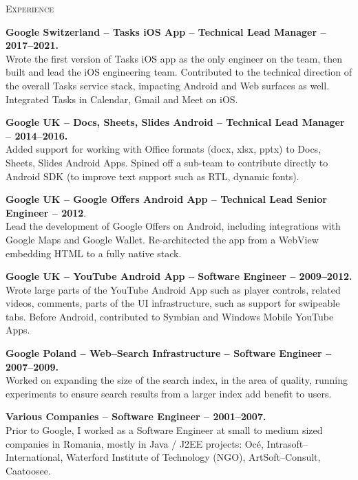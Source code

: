 \documentclass[10pt]{article}
\begin{document}
\vspace{0.16in}
\noindent
\textcolor{Primary}{{\large \textsc{Experience}}}
\begin{list}{}{\leftmargin=0em}

\item
{\bf Google Switzerland -- Tasks iOS App -- Technical Lead Manager -- 2017--2021.}\\
Wrote the first version of Tasks iOS app as the only engineer on the team, then built and lead the iOS engineering team.
Contributed to the technical direction of the overall Tasks service stack, impacting Android and Web surfaces
as well. Integrated Tasks in Calendar, Gmail and Meet on iOS.
  
\item
{\bf Google UK -- Docs, Sheets, Slides Android -- Technical Lead Manager -- 2014--2016.}\\
Added support for working with Office formats (docx, xlsx, pptx) to Docs, Sheets, Slides Android Apps. Spined off a
sub-team to contribute directly to Android SDK (to improve text support such as RTL, dynamic fonts). 

\item
{\bf Google UK -- Google Offers Android App -- Technical Lead Senior Engineer -- 2012}.\\
Lead the development of Google Offers on Android, including integrations with Google Maps and Google Wallet.
Re-architected the app from a WebView embedding HTML to a fully native stack.

\item
{\bf Google UK -- YouTube Android App -- Software Engineer -- 2009--2012.}\\
Wrote large parts of the YouTube Android App such as player controls, related videos, comments, parts of the UI 
infrastructure, such as support for swipeable tabs.
Before Android, contributed to Symbian and Windows Mobile YouTube Apps.

\item
{\bf Google Poland -- Web--Search Infrastructure -- Software Engineer -- 2007--2009.}\\
Worked on expanding the size of the search index, in the area of quality, running experiments to ensure
search results from a larger index add benefit to users.

\item
{\bf Various Companies -- Software Engineer -- 2001--2007.}\\
Prior to Google, I worked as a Software Engineer at small to medium sized companies in Romania, mostly in Java / J2EE projects:
Oc\'e, Intrasoft--International, Waterford Institute of Technology (NGO), ArtSoft--Consult, Caatoosee.

\end{list}
\end{document}
